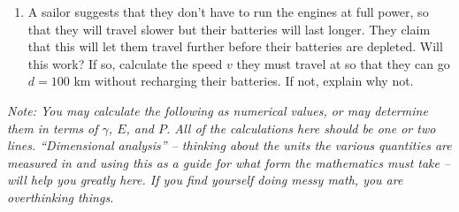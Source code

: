 \documentclass[12pt]{article}
\begin{document}
\begin{enumerate}
\begin{enumerate}
	\item A sailor suggests that they don't have to run the engines at full power, so that they will travel slower but their batteries will last longer. They claim that this will let them travel further before their batteries are depleted. Will this work? If so, calculate the speed $v$ they must travel at so that they can go $d=100$ km without recharging their batteries. If not, explain why not.
\end{enumerate}

{\it Note: You may calculate the following as numerical values, or may determine them in terms of $\gamma$, $E$, and $P$. All of the calculations here should be one or two lines. ``Dimensional analysis'' -- thinking about the units the various quantities are measured in and using this as a guide for what form the mathematics must take -- will help you greatly here. If you find yourself doing messy math, you are overthinking things.}


 

\end{enumerate}
\end{document}
